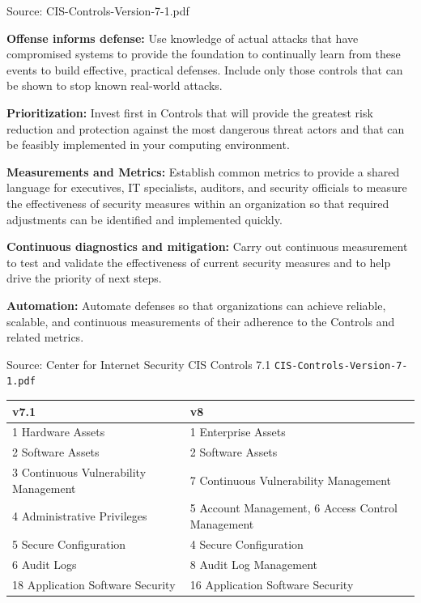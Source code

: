 \documentclass[Screen16to9,17pt]{foils}
\begin{document}
Source:  CIS-Controls-Version-7-1.pdf


\begin{list2}
\item {\bf Offense informs defense:} Use knowledge of actual attacks that have
compromised systems to provide the foundation to continually learn
from these events to build effective, practical defenses. Include only
those controls that can be shown to stop known real-world attacks.
\item {\bf Prioritization:} Invest first in Controls that will provide the greatest risk
reduction and protection against the most dangerous threat actors
and that can be feasibly implemented in your computing environment.
\item {\bf Measurements and Metrics:} Establish common metrics to provide a
shared language for executives, IT specialists, auditors, and security
officials to measure the effectiveness of security measures within
an organization so that required adjustments can be identified and
implemented quickly.
\item {\bf Continuous diagnostics and mitigation:} Carry out continuous
measurement to test and validate the effectiveness of current security
measures and to help drive the priority of next steps.
\item {\bf Automation:} Automate defenses so that organizations can achieve
reliable, scalable, and continuous measurements of their adherence to
the Controls and related metrics.
\end{list2}

{\footnotesize Source: Center for Internet Security CIS Controls 7.1 \verb+CIS-Controls-Version-7-1.pdf+}



{\footnotesize
\begin{tabular}{ll}
v7.1 & v8 \\ \hline
1 Hardware Assets & 1 Enterprise Assets \\
2 Software Assets & 2 Software Assets \\
3 Continuous Vulnerability Management & 7 Continuous Vulnerability Management \\
4 Administrative Privileges & 5 Account Management, 6 Access Control Management \\
5 Secure Configuration & 4 Secure Configuration \\
6 Audit Logs & 8 Audit Log Management \\
18 Application Software Security & 16 Application Software Security \\
\end{tabular}
}
\end{document}

